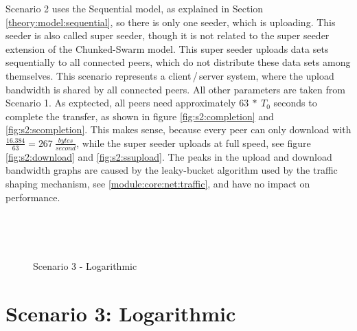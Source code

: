 Scenario 2 uses the Sequential model, as explained in Section \ref{theory:model:sequential}, so there is only one seeder, which is uploading. This seeder is also called super seeder, though it is not related to the super seeder extension of the Chunked-Swarm model. This super seeder uploads data sets sequentially to all connected peers, which do not distribute these data sets among themselves. This scenario represents a client\,/\,server system, where the upload bandwidth is shared by all connected peers. All other parameters are taken from Scenario 1. As exptected, all peers need approximately $63\:*\:T_0$ seconds to complete the transfer, as shown in figure \ref{fig:s2:completion} and \ref{fig:s2:scompletion}. This makes sense, because every peer can only download with $\frac{16.384}{63}=267\:\frac{bytes}{second}$, while the super seeder uploads at full speed, see figure \ref{fig:s2:download} and \ref{fig:s2:ssupload}. The peaks in the upload and download bandwidth graphs are caused by the leaky-bucket algorithm used by the traffic shaping mechanism, see \ref{module:core:net:traffic}, and have no impact on performance.




\begin{figure}[!ht]
	\begin{center}	
		~ %

	 	~ %

		\caption{Scenario 3 - Logarithmic}
		\label{fig:s3}
	\end{center}
\end{figure}

\pagebreak
\section{Scenario 3: Logarithmic}
\label{evaluation:3}

